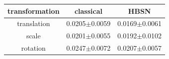 \begin{tabular}{|c|c|c|}\hline
transformation & classical & HBSN \\ \hline
translation & 0.0205$\pm$0.0059 & 0.0169$\pm$0.0061 \\ \hline
scale & 0.0201$\pm$0.0055 & 0.0192$\pm$0.0102 \\ \hline
rotation & 0.0247$\pm$0.0072 & 0.0207$\pm$0.0057 \\ \hline
\end{tabular}

